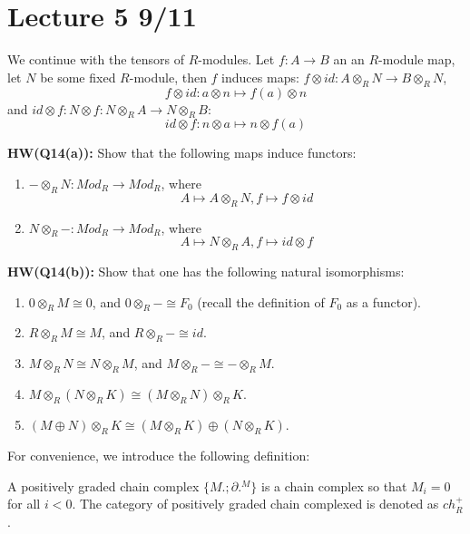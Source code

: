 \section{Lecture 5 9/11}
We continue with the tensors of $R$-modules. Let $f:A\to B$ an an $R$-module map, let $N$ be some fixed $R$-module, then $f$ induces maps:  $f\otimes id: A\otimes_R N\to B\otimes_R N$, 
\begin{equation*}
    f\otimes id: a\otimes n\mapsto f(a)\otimes n
\end{equation*}
and $id\otimes f: N\otimes f: N\otimes_R A\to N\otimes_R B:$
\begin{equation*}
    id\otimes f: n\otimes a\mapsto n\otimes f(a)
\end{equation*}
\begin{prob}
    \textbf{HW(Q14(a)): } Show that the following maps induce functors:
    \begin{enumerate}
        \item $-\otimes_R N: Mod_R\to Mod_R$, where 
        \begin{equation*}
            A\mapsto A\otimes_R N, f\mapsto f\otimes id
        \end{equation*}
        \item $N\otimes_R -: Mod_R\to Mod_R$, where \begin{equation*}
            A\mapsto N\otimes_R A, f\mapsto id\otimes f
        \end{equation*}
    \end{enumerate}
\end{prob}


\begin{prob}
    \textbf{HW(Q14(b)):} Show that one has the following natural isomorphisms:
    \begin{enumerate}
        \item $0\otimes_R M\cong 0$, and $0\otimes_R -\cong F_0$ (recall the definition of $F_0$ as a functor).
        \item $R\otimes_R M\cong M$, and $R\otimes_R-\cong id$.
        \item $M\otimes_R N\cong N\otimes_R M$, and $M\otimes_R-\cong -\otimes_R M$.
        \item $M\otimes_R(N\otimes_R K)\cong (M\otimes_R N)\otimes_R K$.
        \item $(M\oplus N)\otimes_RK\cong (M\otimes_R K)\oplus(N\otimes_R K)$.
    \end{enumerate}
\end{prob}
For convenience, we introduce the following definition:
\begin{defn}
    A positively graded chain complex $\{M.;\partial.^M\}$ is a chain complex so that $M_i=0$ for all $i<0$. The category of positively graded chain complexed is denoted as $ch_R^+$.
\end{defn}

